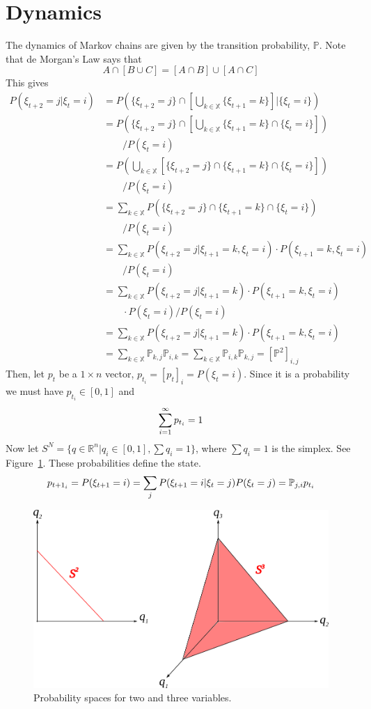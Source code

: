\section{Dynamics}
The dynamics of Markov chains are given by the transition probability, $\mathbb{P}$.
Note that de Morgan's Law says that
$$A\cap[B\cup C] = [A\cap B] \cup [A\cap C]$$
This gives
\begin{align*}
P\left(\xi_{t+2}=j | \xi_t=i\right) &= P\left(\{\xi_{t+2}=j\} \cap \left[\bigcup_{k\in\mathbb{X}}\{\xi_{t+1}=k\}\right] | \{\xi_t=i\}\right) \\
&= P\left(\{\xi_{t+2}=j\} \cap \left[\bigcup_{k\in\mathbb{X}}\{\xi_{t+1}=k\} \cap \{\xi_t=i\}\right]\right) \\
&\qquad / P(\xi_t=i) \\
&= P\left(\bigcup_{k\in\mathbb{X}}[\{\xi_{t+2}=j\} \cap \{\xi_{t+1}=k\} \cap \{\xi_t=i\}]\right) \\
&\qquad / P(\xi_t=i) \\
&= \sum_{k\in\mathbb{X}} P(\{\xi_{t+2}=j\} \cap \{\xi_{t+1}=k\} \cap \{\xi_t=i\}) \\
&\qquad / P(\xi_t=i) \\
&= \sum_{k\in\mathbb{X}} P(\xi_{t+2}=j | \xi_{t+1}=k,\xi_t=i) \cdot P(\xi_{t+1}=k,\xi_t=i) \\
&\qquad / P(\xi_t=i) \\
&= \sum_{k\in\mathbb{X}} P(\xi_{t+2}=j | \xi_{t+1}=k) \cdot P(\xi_{t+1}=k,\xi_t=i) \\
&\qquad \cdot P(\xi_t=i) / P(\xi_t=i) \\
&= \sum_{k\in\mathbb{X}} P(\xi_{t+2}=j | \xi_{t+1}=k) \cdot P(\xi_{t+1}=k,\xi_t=i) \\
&= \sum_{k\in\mathbb{X}} \mathbb{P}_{k,j}\mathbb{P}_{i,k} = \sum_{k\in\mathbb{X}} \mathbb{P}_{i,k}\mathbb{P}_{k,j} = {\left[\mathbb{P}^2\right]}_{i,j}
\end{align*}
Then, let $p_t$ be a $1\times n$ vector, $p_{t_i}={[p_t]}_i=P(\xi_t=i)$.
Since it is a probability we must have $p_{t_i}\in[0,1]$ and
$$\sum_{i=1}^\infty p_{t_i}=1$$
Now let $S^N=\{q\in\mathbb{R}^n|q_i\in[0,1],\sum q_i=1\}$, where $\sum q_i=1$ is the simplex.
See Figure~\ref{fig:09s2s3}.
These probabilities define the state.
$$p_{{t+1}_i} = P(\xi_{t+1}=i) = \sum_j P(\xi_{t+1}=i|\xi_t=j)P(\xi_t=j) = \mathbb{P}_{j,i} p_{t_i}$$

\begin{figure}[ht!]
\centering
\includegraphics[width=.4\textwidth]{images/09s2s3}
\caption{Probability spaces for two and three variables.}
\label{fig:09s2s3}
\end{figure}

